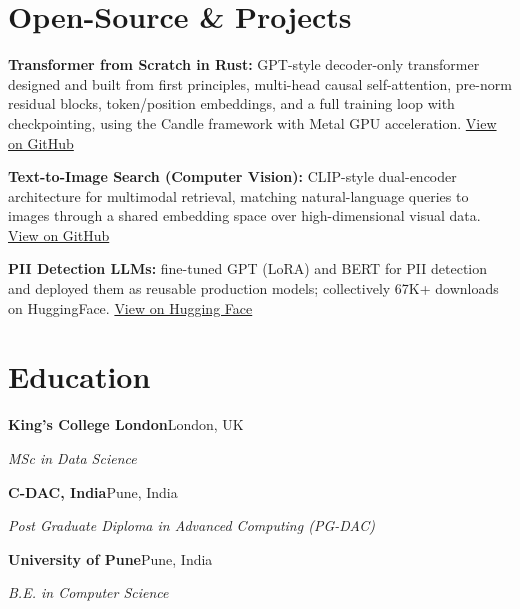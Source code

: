 \documentclass[10pt,a4paper]{article}
\begin{document}
\section{Open-Source \& Projects}
\begin{tight}
  \item \textbf{Transformer from Scratch in Rust:} GPT-style decoder-only transformer designed and built from first principles, multi-head causal self-attention, pre-norm residual blocks, token/position embeddings, and a full training loop with checkpointing, using the Candle framework with Metal GPU acceleration. \href{https://github.com/abhijeetscode/transformer-rust}{View on GitHub}
  \item \textbf{Text-to-Image Search (Computer Vision):} CLIP-style dual-encoder architecture for multimodal retrieval, matching natural-language queries to images through a shared embedding space over high-dimensional visual data. \href{https://github.com/abhijeetscode/text-to-image-search}{View on GitHub}
  \item \textbf{PII Detection LLMs:} fine-tuned GPT (LoRA) and BERT for PII detection and deployed them as reusable production models; collectively 67K+ downloads on HuggingFace. \href{https://huggingface.co/ab-ai/pii_model}{View on Hugging Face}
\end{tight}

\section{Education}
{\color{company}\bfseries King's College London}\hfill {\color{muted}London, UK}\par
{\itshape MSc in Data Science}\par\vspace{2pt}
{\color{company}\bfseries C-DAC, India}\hfill {\color{muted}Pune, India}\par
{\itshape Post Graduate Diploma in Advanced Computing (PG-DAC)}\par\vspace{2pt}
{\color{company}\bfseries University of Pune}\hfill {\color{muted}Pune, India}\par
{\itshape B.E. in Computer Science}\par
\end{document}
